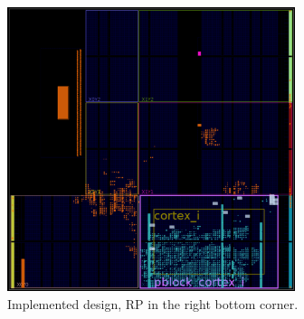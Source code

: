 \begin{figure}[h!]
    \centering
    \includegraphics[width=0.75\textwidth]{figures/implementation.pdf}
    \caption{Implemented design, \gls{RP} in the right bottom corner.}\label{fig:implementation}
\end{figure}